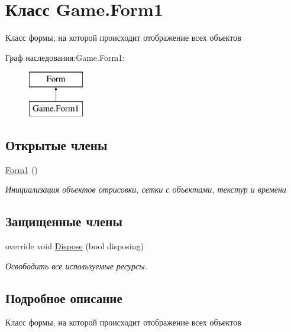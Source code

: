 \hypertarget{class_game_1_1_form1}{}\section{Класс Game.\+Form1}
\label{class_game_1_1_form1}


Класс формы, на которой происходит отображение всех объектов  


Граф наследования\+:Game.\+Form1\+:\begin{figure}[H]
\begin{center}
\leavevmode
\includegraphics[height=2.000000cm]{class_game_1_1_form1}
\end{center}
\end{figure}
\subsection*{Открытые члены}
\begin{DoxyCompactItemize}
\item 
\hyperlink{class_game_1_1_form1_a6816169b9fcc0021728c2944b192e52c}{Form1} ()
\begin{DoxyCompactList}\small\item\em Инициализация объектов отрисовки, сетки с объектами, текстур и времени \end{DoxyCompactList}\end{DoxyCompactItemize}
\subsection*{Защищенные члены}
\begin{DoxyCompactItemize}
\item 
override void \hyperlink{class_game_1_1_form1_ac06680e001f7a894e19cd07852190ea1}{Dispose} (bool disposing)
\begin{DoxyCompactList}\small\item\em Освободить все используемые ресурсы. \end{DoxyCompactList}\end{DoxyCompactItemize}


\subsection{Подробное описание}
Класс формы, на которой происходит отображение всех объектов 



